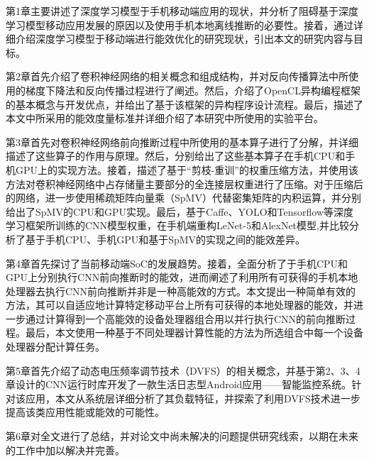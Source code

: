 第1章主要讲述了深度学习模型于手机移动端应用的现状，并分析了阻碍基于深度学习模型移动应用发展的原因以及使用手机本地离线推断的必要性。接着，通过详细介绍深度学习模型于移动端进行能效优化的研究现状，引出本文的研究内容与目标。

第2章首先介绍了卷积神经网络的相关概念和组成结构，并对反向传播算法中所使用的梯度下降法和反向传播过程进行了阐述。然后，介绍了OpenCL异构编程框架的基本概念与开发优点，并给出了基于该框架的异构程序设计流程。最后，描述了本文中所采用的能效度量标准并详细介绍了本研究中所使用的实验平台。

第3章首先对卷积神经网络前向推断过程中所使用的基本算子进行了分解，并详细描述了这些算子的作用与原理。然后，分别给出了这些基本算子在手机CPU和手机GPU上的实现方法。接着，描述了基于“剪枝-重训”的权重压缩方法，并使用该方法对卷积神经网络中占存储量主要部分的全连接层权重进行了压缩。对于压缩后的网络，进一步使用稀疏矩阵向量乘（SpMV）代替密集矩阵的内积运算，并分别给出了SpMV的CPU和GPU实现。最后，基于Caffe、YOLO和Tensorflow等深度学习框架所训练的CNN模型权重，在手机端重构LeNet-5\cite{lecun1998gradient}和AlexNet\cite{krizhevsky2012imagenet}模型,并比较分析了基于手机CPU、手机GPU和基于SpMV的实现之间的能效差异。

第4章首先探讨了当前移动端SoC的发展趋势。接着，全面分析了于手机CPU和GPU上分别执行CNN前向推断时的能效，进而阐述了利用所有可获得的手机本地处理器去执行CNN前向推断并非是一种高能效的方式。本文提出一种简单有效的方法，其可以自适应地计算特定移动平台上所有可获得的本地处理器的能效，并进一步通过计算得到一个高能效的设备处理器组合用以并行执行CNN的前向推断过程\cite{wang2017rethinking}。最后，本文使用一种基于不同处理器计算性能的方法为所选组合中每一个设备处理器分配计算任务。

第5章首先介绍了动态电压频率调节技术（DVFS）的相关概念，并基于第2、3、4章设计的CNN运行时库开发了一款生活日志型Android应用——智能监控系统。针对该应用，本文从系统层详细分析了其负载特征，并探索了利用DVFS技术进一步提高该类应用性能或能效的可能性。

第6章对全文进行了总结，并对论文中尚未解决的问题提供研究线索，以期在未来的工作中加以解决并完善。

\cleardoublepage 
